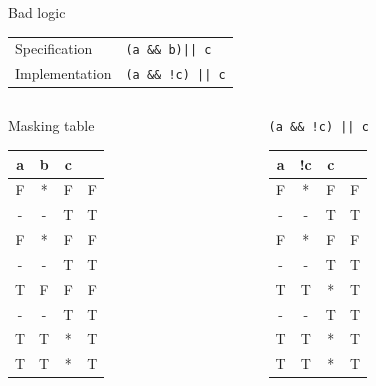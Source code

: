\documentclass[xcolor = {dvipsnames, table}]{beamer}
\begin{document}
\begin{frame}
    \begin{block}{Bad logic}
        \begin{tabular}{l l}
            Specification  & \texttt{(a \&\& b)\quad || c} \\
            Implementation & \texttt{(a \&\& !c) || c} \\
        \end{tabular}
    \end{block}
\end{frame}

\begin{frame}[fragile]
    \begin{columns}
        \begin{column}{0.3\textwidth}
            \centering
            Masking table
            \begin{tabular}{c c c c}
                        a & b & c & \\
                        \hline
                        F & * & F & F \\
                        - & - & T & T \\
                        F & * & F & F \\
                        - & - & T & T \\

                        T & F & F & F \\
                        - & - & T & T \\
                        T & T & * & T \\
                        T & T & * & T \\
            \end{tabular}
        \end{column}

        \begin{column}{0.3\textwidth}
            \centering
            \lstinline{(a && !c) || c}
            \begin{tabular}{c c c c}
                        a & !c & c & \\
                        \hline
                        F & * & F & F \\
                        - & - & T & T \\
                        F & * & F & F \\
                        - & - & T & T \\

                        T & T & * & T \\
                        - & - & T & T \\
                        T & T & * & T \\
                        T & T & * & T \\
            \end{tabular}
        \end{column}
    \end{columns}
\end{frame}
\end{document}
